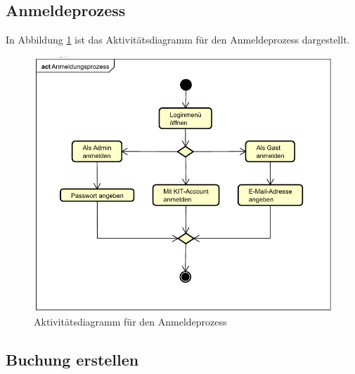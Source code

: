 \subsection{Anmeldeprozess}

In Abbildung \ref{fig:activity_diagram_login} ist das Aktivitätsdiagramm für den Anmeldeprozess dargestellt.
\begin{figure}[ht]
    \centering
    \includegraphics[scale=0.75]{figures/activitydiagrams/anmeldeprozess}
    \caption{Aktivitätsdiagramm für den Anmeldeprozess}
    \label{fig:activity_diagram_login}
\end{figure}
\clearpage
\subsection{Buchung erstellen}

